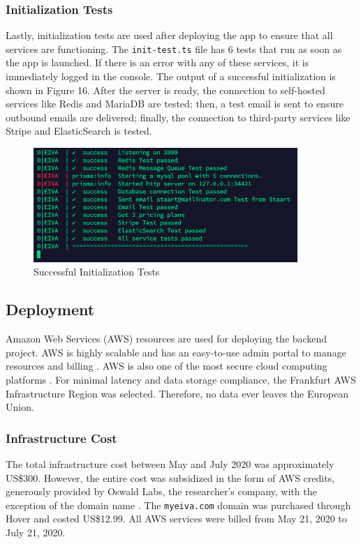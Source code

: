 \documentclass{article}
\begin{document}
\subsubsection{Initialization Tests}

Lastly, initialization tests are used after deploying the app to ensure that all services are functioning. The \texttt{init-test.ts} file has 6 tests that run as soon as the app is launched. If there is an error with any of these services, it is immediately logged in the console. The output of a successful initialization is shown in Figure 16. After the server is ready, the connection to self-hosted services like Redis and MariaDB are tested; then, a test email is sent to ensure outbound emails are delivered; finally, the connection to third-party services like Stripe and ElasticSearch is tested.

\begin{figure}[h]
	\center
	\includegraphics[width=10cm]{init-tests.png}
	\caption{Successful Initialization Tests}
\end{figure}

\subsection{Deployment}

Amazon Web Services (AWS) resources are used for deploying the backend project. AWS is highly scalable and has an easy-to-use admin portal to manage resources and billing \cite{shokeen_deploying_2019}. AWS is also one of the most secure cloud computing platforms \cite{narula_cloud_2015}. For minimal latency and data storage compliance, the Frankfurt AWS Infrastructure Region was selected. Therefore, no data ever leaves the European Union.

\subsubsection{Infrastructure Cost}

The total infrastructure cost between May and July 2020 was approximately US\$300. However, the entire cost was subsidized in the form of AWS credits, generously provided by Oswald Labs, the researcher's company, with the exception of the domain name \cite{noauthor_oswald_nodate}. The \texttt{myeiva.com} domain was purchased through Hover and costed US\$12.99. All AWS services were billed from May 21, 2020 to July 21, 2020.
\end{document}
